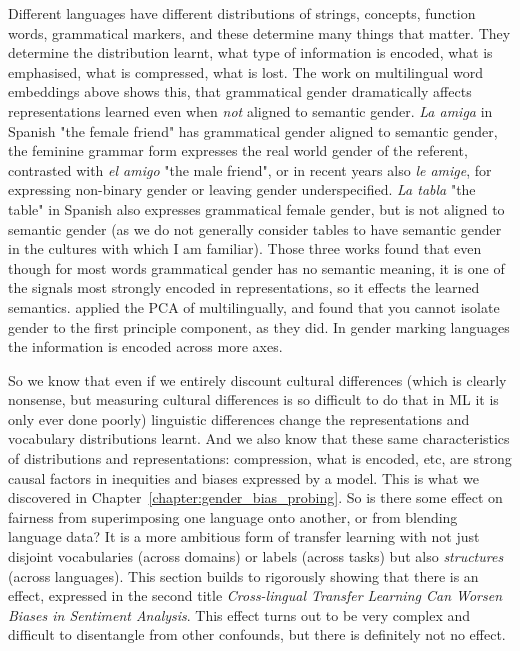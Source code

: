 Different languages have different distributions of strings, concepts, function words, grammatical markers, and these determine many things that matter. They determine the distribution learnt, what type of information is encoded, what is emphasised, what is compressed, what is lost. The work on multilingual word embeddings above \citep{} shows this, that grammatical gender dramatically affects representations learned even when \textit{not} aligned to semantic gender. \textit{La amiga} in Spanish "the female friend" has grammatical gender aligned to semantic gender, the feminine grammar form expresses the real world gender of the referent, contrasted with \textit{el amigo} "the male friend", or in recent years also \textit{le amige}, for expressing non-binary gender or leaving gender underspecified. \textit{La tabla} "the table" in Spanish also expresses grammatical female gender, but is not aligned to semantic gender (as we do not generally consider tables to have semantic gender in the cultures with which I am familiar)\citep{corbett? grammar chapter}. Those three works found that even though for most words grammatical gender has no semantic meaning, it is one of the signals most strongly encoded in representations, so it effects the learned semantics. \citep{gonens gender bias workshop paper} applied the PCA of \citet{bolukbasi} multilingually, and found that you cannot isolate gender to the first principle component, as they did. In gender marking languages the information is encoded across more axes.

So we know that even if we entirely discount cultural differences (which is clearly nonsense, but measuring cultural differences is so difficult to do that in ML it is only ever done poorly) linguistic differences change the representations and vocabulary distributions learnt. And we also know that these same characteristics of distributions and representations: compression, what is encoded, etc, are strong causal factors in inequities and biases expressed by a model. This is what we discovered in Chapter~\ref{chapter:gender_bias_probing}.  So is there some effect on fairness from superimposing one language onto another, or from blending language data? It is a more ambitious form of transfer learning with not just disjoint vocabularies (across domains) or labels (across tasks) but also \textit{structures} (across languages). This section builds to rigorously showing that there is an effect, expressed in the second title \textit{Cross-lingual Transfer Learning Can Worsen Biases in Sentiment Analysis}. This effect turns out to be very complex and difficult to disentangle from other confounds, but there is definitely not no effect. 

